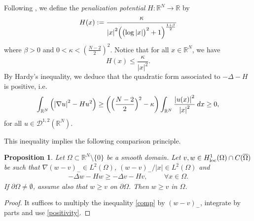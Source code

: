 \documentclass[a4paper]{amsart}
\newtheorem{proposition}{Proposition}[section]
\begin{document}
Following \cite{MVS}, we define the \emph{penalization potential} $H
: {\mathbb{R}}^N \to {\mathbb{R}}$ by
\begin{align*}
 H(x) := \frac{\kappa}{{\left| {x} \right|}^2 \Bigl( \bigl(\log {\left| {x} \right|} \bigr)^2+1 \Bigr)^{\frac{1+\beta}{2}}}
\end{align*}
where $\beta > 0$ and $0 < \kappa < (\frac{N-2}{2})^2$.
Notice that for all $x \in {\mathbb{R}}^N$, we have
\[
 H(x) \leq \frac{\kappa}{{\left| {x} \right|}^2}.
\]
By Hardy's inequality, we deduce that the quadratic form associated to $- \Delta - H$ is positive, i.e.
\begin{align}\label{positivity}
 \int_{{\mathbb{R}}^N} \left( {\left| {\nabla u} \right|}^2 - H u^2 \right) \geq \biggl(  \Bigl( \frac{N-2}{2} \Bigr)^2 - \kappa \biggr)
\int_{{\mathbb{R}}^N} \frac{{\left| {u(x)} \right|}^2}{{\left| {x} \right|}^2}\: dx \geq 0,
\end{align}
for all $u \in \mathcal{D}^{1,2}({\mathbb{R}}^N)$. 

This inequality implies the following comparison principle.
\begin{proposition}\label{Th:comp}
Let $\Omega \subset {\mathbb{R}}^N \setminus\{0\}$ be a smooth domain. Let $v,w \in H^1_{\textnormal{loc}}(\Omega)\cap
C(\overline{\Omega})$ be such
that $\nabla (w-v)_- \in L^2(\Omega)$, $(w-v)_-/{\left| {x} \right|} \in L^2(\Omega)$ and
\begin{align}\label{comp}
 - \Delta w - H w \geq - \Delta v - H v, \hspace{1cm} \forall x \in \Omega.
\end{align}
If $\partial\Omega \neq \emptyset$, assume also that $w \geq v$ on $\partial\Omega$. Then $w \geq v$ in $\Omega$.
\end{proposition}
\begin{proof}
 It suffices to multiply the inequality \eqref{comp} by $(w-v)_-$, integrate by parts and use \eqref{positivity}.
\end{proof}
\end{document}
